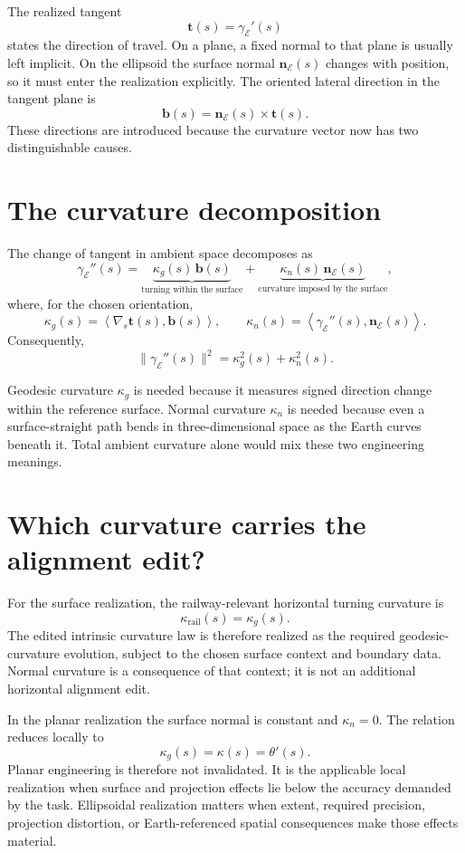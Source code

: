 The realized tangent
\[
\mathbf t(s)=\gamma_{\mathcal E}'(s)
\]
states the direction of travel. On a plane, a fixed normal to that plane
is usually left implicit. On the ellipsoid the surface normal
\(\mathbf n_{\mathcal E}(s)\) changes with position, so it must enter the
realization explicitly. The oriented lateral direction in the tangent
plane is
\[
\mathbf b(s)=\mathbf n_{\mathcal E}(s)\times\mathbf t(s).
\]
These directions are introduced because the curvature vector now has
two distinguishable causes.

\section{The curvature decomposition}

The change of tangent in ambient space decomposes as
\[
\gamma_{\mathcal E}''(s)
=
\underbrace{\kappa_g(s)\,\mathbf b(s)}_{
\text{turning within the surface}}
+
\underbrace{\kappa_n(s)\,\mathbf n_{\mathcal E}(s)}_{
\text{curvature imposed by the surface}},
\]
where, for the chosen orientation,
\[
\kappa_g(s)=
\left\langle\nabla_s\mathbf t(s),\mathbf b(s)\right\rangle,
\qquad
\kappa_n(s)=
\left\langle\gamma_{\mathcal E}''(s),
\mathbf n_{\mathcal E}(s)\right\rangle.
\]
Consequently,
\[
\lVert\gamma_{\mathcal E}''(s)\rVert^2
=\kappa_g^2(s)+\kappa_n^2(s).
\]

Geodesic curvature \(\kappa_g\) is needed because it measures signed
direction change within the reference surface. Normal curvature
\(\kappa_n\) is needed because even a surface-straight path bends in
three-dimensional space as the Earth curves beneath it. Total ambient
curvature alone would mix these two engineering meanings.

\section{Which curvature carries the alignment edit?}

For the surface realization, the railway-relevant horizontal turning
curvature is
\[
\kappa_{\mathrm{rail}}(s)=\kappa_g(s).
\]
The edited intrinsic curvature law is therefore realized as the required
geodesic-curvature evolution, subject to the chosen surface context and
boundary data. Normal curvature is a consequence of that context; it is
not an additional horizontal alignment edit.

In the planar realization the surface normal is constant and
\(\kappa_n=0\). The relation reduces locally to
\[
\kappa_g(s)=\kappa(s)=\theta'(s).
\]
Planar engineering is therefore not invalidated. It is the applicable
local realization when surface and projection effects lie below the
accuracy demanded by the task. Ellipsoidal realization matters when
extent, required precision, projection distortion, or Earth-referenced
spatial consequences make those effects material.


